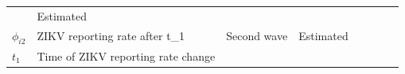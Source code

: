 \documentclass[10pt,letterpaper]{article}
\begin{document}
\begin{longtable}[]{@{}llllllll@{}}
\begin{minipage}[t]{0.05\columnwidth}
\end{minipage} & \begin{minipage}[t]{0.05\columnwidth}\raggedright\strut
Estimated\strut
\end{minipage} & \begin{minipage}[t]{0.04\columnwidth}\raggedright\strut
\strut
\end{minipage} & \begin{minipage}[t]{0.04\columnwidth}\raggedright\strut
\strut
\end{minipage} & \begin{minipage}[t]{0.14\columnwidth}\raggedright\strut
\strut
\end{minipage} & \begin{minipage}[t]{0.26\columnwidth}\raggedright\strut
\strut
\end{minipage}\tabularnewline
\begin{minipage}[t]{0.04\columnwidth}\raggedright\strut
\(\phi_{i2}\)\strut
\end{minipage} & \begin{minipage}[t]{0.17\columnwidth}\raggedright\strut
ZIKV reporting rate after t\_1\strut
\end{minipage} & \begin{minipage}[t]{0.05\columnwidth}\raggedright\strut
Second wave\strut
\end{minipage} & \begin{minipage}[t]{0.05\columnwidth}\raggedright\strut
Estimated\strut
\end{minipage} & \begin{minipage}[t]{0.04\columnwidth}\raggedright\strut
\strut
\end{minipage} & \begin{minipage}[t]{0.04\columnwidth}\raggedright\strut
\strut
\end{minipage} & \begin{minipage}[t]{0.14\columnwidth}\raggedright\strut
\strut
\end{minipage} & \begin{minipage}[t]{0.26\columnwidth}\raggedright\strut
\strut
\end{minipage}\tabularnewline
\begin{minipage}[t]{0.04\columnwidth}\raggedright\strut
\(t_1\)\strut
\end{minipage} & \begin{minipage}[t]{0.17\columnwidth}\raggedright\strut
Time of ZIKV reporting rate change\strut
\end{minipage} & \begin{minipage}[t]{0.05\columnwidth}\raggedright\strut

\end{minipage}
\end{longtable}
\end{document}
